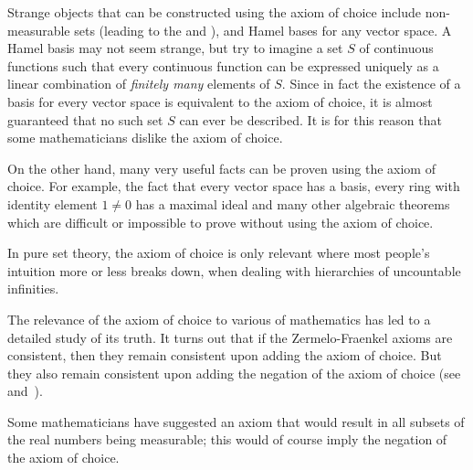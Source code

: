 \documentclass{article}
\begin{document}
Strange objects that can be constructed using the axiom of choice include non-measurable sets (leading to the  and ), and Hamel bases for any vector space. A Hamel
basis may not seem strange, but try to imagine a set $S$ of continuous functions such that every continuous function can be expressed uniquely as a linear combination of \emph{finitely many} elements of $S$. Since in fact the existence of a basis for every vector space is equivalent to the axiom of
choice, it is almost guaranteed that no such set $S$ can ever be described. It is for this reason that some mathematicians dislike the axiom of choice.

On the other hand, many very useful facts can be proven using the axiom of choice. For example, the fact that every vector space has a basis, every ring with identity element $1\neq 0$ has a maximal ideal and many other algebraic theorems which are difficult or impossible to prove without using the axiom of choice.

In pure set theory, the axiom of choice is only relevant where most people's intuition more or less breaks down, when dealing with hierarchies of uncountable infinities.

The relevance of the axiom of choice to various  of mathematics has led to a detailed study of its truth. It turns out that if the Zermelo-Fraenkel axioms are consistent, then they remain consistent upon adding the axiom of choice. But they also remain consistent upon adding the negation of the axiom of choice (see~\cite{G} and~\cite{C}).

Some mathematicians have suggested an axiom that would result in all subsets of the real numbers being measurable; this would of course imply the negation of the axiom of choice.
\end{document}
